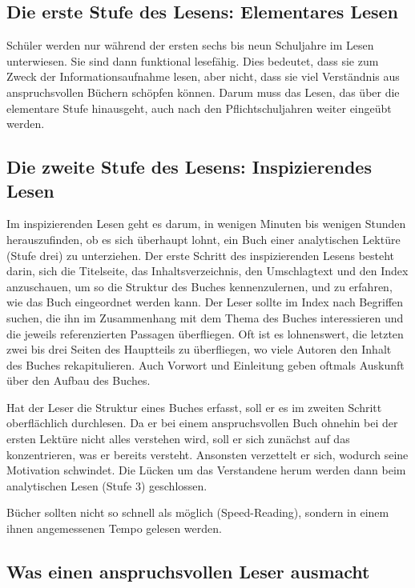 \documentclass[a4paper,11pt]{scrartcl}
\begin{document}
\subsection{Die erste Stufe des Lesens: Elementares Lesen}

Schüler werden nur während der ersten sechs bis neun Schuljahre im Lesen unterwiesen. Sie sind dann funktional lesefähig. Dies bedeutet, dass sie zum Zweck der Informationsaufnahme lesen, aber nicht, dass sie viel Verständnis aus anspruchsvollen Büchern schöpfen können. Darum muss das Lesen, das über die elementare Stufe hinausgeht, auch nach den Pflichtschuljahren weiter eingeübt werden.

\subsection{Die zweite Stufe des Lesens: Inspizierendes Lesen}

Im inspizierenden Lesen geht es darum, in wenigen Minuten bis wenigen Stunden herauszufinden, ob es sich überhaupt lohnt, ein Buch einer analytischen Lektüre (Stufe drei) zu unterziehen. Der erste Schritt des inspizierenden Lesens besteht darin, sich die Titelseite, das Inhaltsverzeichnis, den Umschlagtext und den Index anzuschauen, um so die Struktur des Buches kennenzulernen, und zu erfahren, wie das Buch eingeordnet werden kann. Der Leser sollte im Index nach Begriffen suchen, die ihn im Zusammenhang mit dem Thema des Buches interessieren und die jeweils referenzierten Passagen überfliegen. Oft ist es lohnenswert, die letzten zwei bis drei Seiten des Hauptteils zu überfliegen, wo viele Autoren den Inhalt des Buches rekapitulieren. Auch Vorwort und Einleitung geben oftmals Auskunft über den Aufbau des Buches.

Hat der Leser die Struktur eines Buches erfasst, soll er es im zweiten Schritt oberflächlich durchlesen. Da er bei einem anspruchsvollen Buch ohnehin bei der ersten Lektüre nicht alles verstehen wird, soll er sich zunächst auf das konzentrieren, was er bereits versteht. Ansonsten verzettelt er sich, wodurch seine Motivation schwindet. Die Lücken um das Verstandene herum werden dann beim analytischen Lesen (Stufe 3) geschlossen.

Bücher sollten nicht so schnell als möglich (Speed-Reading), sondern in einem ihnen angemessenen Tempo gelesen werden.

\subsection{Was einen anspruchsvollen Leser ausmacht}
\end{document}
